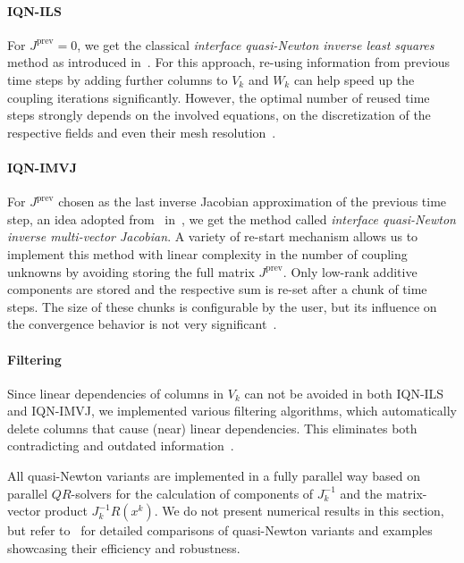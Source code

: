 \paragraph{IQN-ILS} For $J^{\text{prev}}=0$, we get the classical \textit{interface quasi-Newton inverse least squares} method as introduced in~\cite{Degroote2009}. For this approach, re-using information from previous time steps by adding further columns to $V_k$ and $W_k$ can help speed up the coupling iterations significantly. However, the optimal number of reused time steps strongly depends on the involved equations, on the discretization of the respective fields and even their mesh resolution~\cite{Scheuf:QN}.

\paragraph{IQN-IMVJ} For $J^{\text{prev}}$ chosen as the last inverse Jacobian approximation of the previous time step, an idea adopted from~\cite{Bogaers2014_MVQN} in~\cite{Lindner2015_MVQN,Scheufele2015}, we get the method called \textit{interface quasi-Newton inverse multi-vector Jacobian}. A variety of re-start mechanism allows us to implement this method with linear complexity in the number of coupling unknowns by avoiding storing the full matrix $J^{\text{prev}}$. Only low-rank additive components are stored and the respective sum is re-set after a chunk of time steps. The size of these chunks is configurable by the user, but its influence on the convergence behavior is not very significant~\cite{Scheuf:QN,Scheufele2019_Diss}.

\paragraph{Filtering} Since linear dependencies of columns in $V_k$ can not be avoided in both IQN-ILS and IQN-IMVJ, we implemented various filtering algorithms, which automatically delete columns that cause (near) linear dependencies. This eliminates both contradicting and outdated information~\cite{Haelterman2015_Filtering}.

All quasi-Newton variants are implemented in a fully parallel way based on parallel $QR$-solvers for the calculation of components of $J_k^{-1}$ and the matrix-vector product $J_k^{-1} R(x^k)$. We do not present numerical results in this section, but refer to~\cite{Mehl2016, Scheuf:QN,Uekermann2016} for detailed comparisons of quasi-Newton variants and examples showcasing their efficiency and robustness. 

